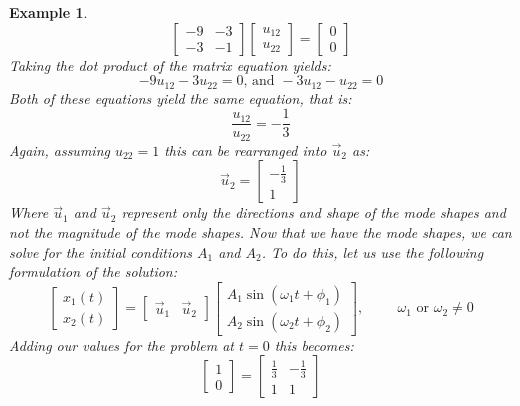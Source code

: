 \documentclass[12pt,letter]{article}
\newtheorem{ex}{Example}
\numberwithin{ex}{section} %
\newenvironment{example}{\begin{mdframed}[middlelinewidth=0.5mm]\begin{ex}\normalfont}{\end{ex}\end{mdframed}}
\numberwithin{re}{section} %
\begin{document}
\begin{example}
\begin{equation}
	 \begin{bmatrix} -9 & -3 \\    -3  & -1 \end{bmatrix} 
	 \begin{bmatrix} u_{12}\\ u_{22}\end{bmatrix}=\begin{bmatrix} 0\\ 0\end{bmatrix}
\end{equation}
Taking the dot product of the matrix equation yields:
\begin{equation}
	-9u_{12} -3u_{22}=0 \text{, and } -3u_{12} - u_{22}=0
\end{equation}
Both of these equations yield the same equation, that is:
\begin{equation}
	\frac{u_{12}}{u_{22}} =-\frac{1}{3}
\end{equation}
Again, assuming $u_{22}=1$  this can be rearranged into $\vec{u}_2$ as:
\begin{equation}
	 \vec{u}_2 = \begin{bmatrix} -\frac{1}{3}\\ 1\end{bmatrix}
\end{equation}
Where $\vec{u}_1$ and $\vec{u}_2$ represent only the directions and shape of the mode shapes and not the magnitude of the mode shapes. 
Now that we have the mode shapes, we can solve for the initial conditions $A_1$ and $A_2$. To do this, let us use the following formulation of the solution:
\begin{equation}
	 \begin{bmatrix} x_1(t) \\  x_2(t) \end{bmatrix} =  \begin{bmatrix} \vec{u}_1 & \vec{u}_2 \end{bmatrix}
	 \begin{bmatrix} A_1 \sin (\omega_1 t + \phi_1 )\\ A_2 \sin (\omega_2 t + \phi_2 )\end{bmatrix}, \hspace{1cm} \omega_1 \text{ or } \omega_2 \neq 0
\end{equation}
Adding our values for the problem at $t=0$ this becomes:
\begin{equation}
	 \begin{bmatrix} 1 \\  0 \end{bmatrix} =  \begin{bmatrix} \frac{1}{3} & -\frac{1}{3} \\ 1 & 1 \end{bmatrix}

\end{equation}
\end{example}
\end{document}

